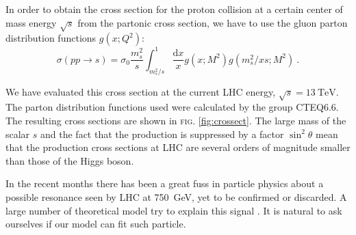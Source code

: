 \documentclass[aps,prd,preprintnumbers,nofootinbibn,twocolumn]{revtex4}
\newcommand{\dif}{\mathrm{d}}
\begin{document}
In order to obtain the cross section for the proton collision at a certain center of mass energy $\sqrt{s}$ from the partonic cross section, we have to use the gluon parton distribution functions $g(x; Q^2)$:
\begin{equation}
\sigma(pp\to s) = \sigma_0 \frac{m_s^2}{s} \int_{m_s^2/s}^1\frac{\dif x}{x} g(x; M^2) g(m_s^2/xs; M^2) \ .
\end{equation}



We have evaluated this cross section at the current LHC energy, $\sqrt{s}=\SI{13}{\tera\electronvolt}$. The parton distribution functions used were calculated by the group \textsc{CTEQ6.6}. The resulting cross sections are shown in \textsc{fig.} \ref{fig:crossect}. The large mass of the scalar $s$ and the fact that the production is suppressed by a factor $\sin^2\theta$ mean that the production cross sections at LHC are several orders of magnitude smaller than those of the Higgs boson.


In the recent months there has been a great fuss in particle physics about a possible resonance seen by LHC at \SI{750}{\giga\electronvolt}\cite{ATLAS:2015, CMS:2015dxe}, yet to be confirmed or discarded. A large number of theoretical model try to explain this signal \cite{Staub:2016dxq}. It is natural to ask ourselves if our model can fit such particle.




 
\end{document}
